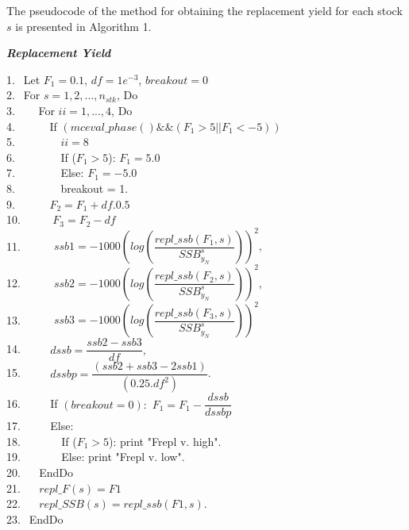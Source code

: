 \documentclass{article}
\begin{document}
The pseudocode of the method for obtaining the replacement yield for each stock $s$ is presented in Algorithm 1.
\begin{algorithm}[H]
	\caption{{\bf \textit{Replacement Yield}}}
	1.  $\  \ $Let $F_1=0.1$, $df=1e^{-3}$, $breakout=0$ \\
	2.  $\  \ $For $s=1,2,...,n_{stk}$, Do\\
    3.  $\  \ \quad$ For $ii=1,...,4$, Do \\
	4.  $\  \ \qquad$ If $(mceval\_phase()\&\&(F_1>5||F_1< -5)) $\\
	5.  $\  \ \qquad$$\quad$ $ii=8$\\
	6.  $\  \ \qquad$$\quad$  If ($F_1>5$): $F_1=5.0$\\
	7.  $\  \ \qquad$$\quad$   Else: $F_1=-5.0$\\
	8.  $\  \ \qquad$$\quad$   breakout = 1. \\
	9.  $\  \ \qquad$   $F_2 = F_1+df.0.5$\\
	10. $  \ \qquad$  $F_3 = F_2 - df$\\
	11. $\quad$ $\quad$  $ssb1=-1000\left(log\left(\dfrac{repl\_ssb(F_1,s)}{SSB^s_{y_N}}\right)\right)^2,$\\
    12. $\quad$ $\quad$  $ssb2=-1000\left(log\left(\dfrac{repl\_ssb(F_2,s)}{SSB^s_{y_N}}\right)\right)^2,$\\
    13. $\quad$ $\quad$  $ssb3=-1000\left(log\left(\dfrac{repl\_ssb(F_3,s)}{SSB^s_{y_N}}\right)\right)^2 $\\
    14. $\quad$$\quad$   $dssb   = \dfrac{ssb2 - ssb3}{df},$\\
    15. 
    $\quad$$\quad$   $dssbp  = \dfrac{(ssb2 + ssb3 - 2 ssb1)}{(0.25. df^2)}$.\\
    16. $\quad$$\quad$   If $(breakout=0):$ $F_1=F_{1}-\dfrac{dssb}{dssbp}$\\
    17. $\quad$$\quad$   Else: \\
    18. $\qquad$$\quad$   If ($F_1>5$): print "Frepl v. high". \\
    19. $\qquad$$\quad$   Else: print "Frepl v. low". \\
    20. $\quad$ EndDo\\
    21. $\quad$ $repl\_F(s) = F1$\\
    22. $\quad$ $repl\_SSB(s) = repl\_ssb(F1,s)$.\\
    23. $\  \ $EndDo
    
\end{algorithm}
\end{document}
